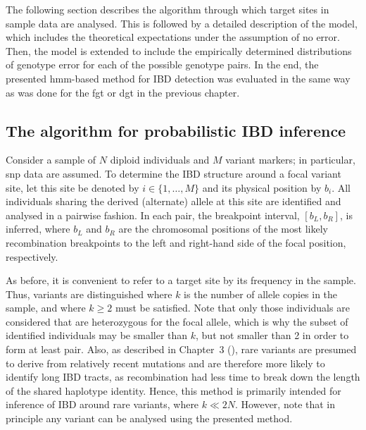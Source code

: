 The following section describes the algorithm through which target sites in sample data are analysed.
This is followed by a detailed description of the model, which includes the theoretical expectations under the assumption of no error.
Then, the model is extended to include the empirically determined distributions of genotype error for each of the possible genotype pairs.
In the end, the presented \gls{hmm}-based method for IBD detection was evaluated in the same way as was done for the \gls{fgt} or \gls{dgt} in the previous chapter.


%
\subsection{The algorithm for probabilistic IBD inference}
%


Consider a sample of $N$ diploid individuals and $M$ variant markers; in particular, \gls{snp} data are assumed.
To determine the IBD structure around a focal variant site, let this site be denoted by ${i \in \lbrace 1, \ldots, M \rbrace}$ and its physical position by $b_i$.
All individuals sharing the derived (alternate) allele at this site are identified and analysed in a pairwise fashion.
In each pair, the breakpoint interval, ${[b_L, b_R]}$, is inferred, where $b_L$ and $b_R$ are the chromosomal positions of the most likely recombination breakpoints to the left and right-hand side of the focal position, respectively.

As before, it is convenient to refer to a target site by its frequency in the sample.
Thus, \fk{} variants are distinguished where $k$ is the number of allele copies in the sample, and where ${k \geq 2}$ must be satisfied.
Note that only those individuals are considered that are heterozygous for the focal allele, which is why the subset of identified individuals may be smaller than $k$, but not smaller than 2 in order to form at least  pair.
Also, as described in Chapter~3 (), rare variants are presumed to derive from relatively recent mutations and are therefore more likely to identify long IBD tracts, as recombination had less time to break down the length of the shared haplotype identity.
Hence, this method is primarily intended for inference of IBD around rare variants, where ${k \ll 2N}$.
However, note that in principle any  variant can be analysed using the presented method.

